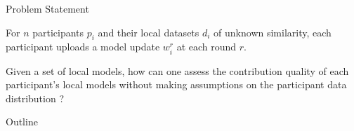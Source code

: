 \begin{frame}{Problem Statement}
  \begin{block}
    For $n$ participants $p_i$ and their local datasets $d_i$ of unknown similarity, each participant uploads a model update $w_i^r$ at each round $r$. 
    
    Given a set of local models, how can one assess the \alert{contribution quality} of each participant’s local models without making assumptions on the \alert{participant data distribution} ?
  \end{block}
\end{frame}

\begin{frame}{Outline}
  \centering
  \begin{minipage}[t]{.8\textwidth}
    \tableofcontents%
  \end{minipage}
\end{frame}

